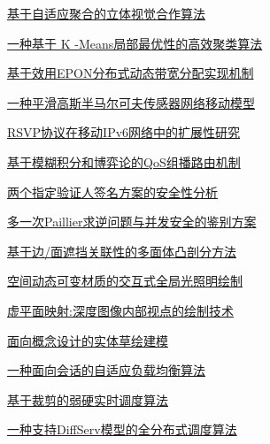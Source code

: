 \documentclass[a4paper]{article}
\begin{document}
\href{http://www.jos.org.cn/ch/reader/download_pdf.aspx?file_no=20080711&year_id=2008&quarter_id=7&falg=1}{基于自适应聚合的立体视觉合作算法}

\href{http://www.jos.org.cn/ch/reader/download_pdf.aspx?file_no=20080712&year_id=2008&quarter_id=7&falg=1}{一种基于 K -Means局部最优性的高效聚类算法}

\href{http://www.jos.org.cn/ch/reader/download_pdf.aspx?file_no=20080713&year_id=2008&quarter_id=7&falg=1}{基于效用EPON分布式动态带宽分配实现机制}

\href{http://www.jos.org.cn/ch/reader/download_pdf.aspx?file_no=20080714&year_id=2008&quarter_id=7&falg=1}{一种平滑高斯半马尔可夫传感器网络移动模型}

\href{http://www.jos.org.cn/ch/reader/download_pdf.aspx?file_no=20080716&year_id=2008&quarter_id=7&falg=1}{RSVP协议在移动IPv6网络中的扩展性研究}

\href{http://www.jos.org.cn/ch/reader/download_pdf.aspx?file_no=20080717&year_id=2008&quarter_id=7&falg=1}{基于模糊积分和博弈论的QoS组播路由机制}

\href{http://www.jos.org.cn/ch/reader/download_pdf.aspx?file_no=20080718&year_id=2008&quarter_id=7&falg=1}{两个指定验证人签名方案的安全性分析}

\href{http://www.jos.org.cn/ch/reader/download_pdf.aspx?file_no=20080719&year_id=2008&quarter_id=7&falg=1}{多一次Paillier求逆问题与并发安全的鉴别方案}

\href{http://www.jos.org.cn/ch/reader/download_pdf.aspx?file_no=20080720&year_id=2008&quarter_id=7&falg=1}{基于边/面遮挡关联性的多面体凸剖分方法}

\href{http://www.jos.org.cn/ch/reader/download_pdf.aspx?file_no=20080721&year_id=2008&quarter_id=7&falg=1}{空间动态可变材质的交互式全局光照明绘制}

\href{http://www.jos.org.cn/ch/reader/download_pdf.aspx?file_no=20080723&year_id=2008&quarter_id=7&falg=1}{虚平面映射:深度图像内部视点的绘制技术}

\href{http://www.jos.org.cn/ch/reader/download_pdf.aspx?file_no=20080724&year_id=2008&quarter_id=7&falg=1}{面向概念设计的实体草绘建模}

\href{http://www.jos.org.cn/ch/reader/download_pdf.aspx?file_no=20080725&year_id=2008&quarter_id=7&falg=1}{一种面向会话的自适应负载均衡算法}

\href{http://www.jos.org.cn/ch/reader/download_pdf.aspx?file_no=20080726&year_id=2008&quarter_id=7&falg=1}{基于裁剪的弱硬实时调度算法}

\href{http://www.jos.org.cn/ch/reader/download_pdf.aspx?file_no=20080727&year_id=2008&quarter_id=7&falg=1}{一种支持DiffServ模型的全分布式调度算法}
\end{document}
